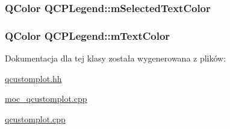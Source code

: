 \subsubsection[{\texorpdfstring{m\+Selected\+Text\+Color}{mSelectedTextColor}}]{\setlength{\rightskip}{0pt plus 5cm}Q\+Color Q\+C\+P\+Legend\+::m\+Selected\+Text\+Color\hspace{0.3cm}{\ttfamily [protected]}}\hypertarget{class_q_c_p_legend_a6c25c8796c6e73e983aae6024965f2be}{}\label{class_q_c_p_legend_a6c25c8796c6e73e983aae6024965f2be}
\subsubsection[{\texorpdfstring{m\+Text\+Color}{mTextColor}}]{\setlength{\rightskip}{0pt plus 5cm}Q\+Color Q\+C\+P\+Legend\+::m\+Text\+Color\hspace{0.3cm}{\ttfamily [protected]}}\hypertarget{class_q_c_p_legend_a478b2d809a7390e9ff8f8bb70d6bd9fe}{}\label{class_q_c_p_legend_a478b2d809a7390e9ff8f8bb70d6bd9fe}


Dokumentacja dla tej klasy została wygenerowana z plików\+:\begin{DoxyCompactItemize}
\item 
\hyperlink{qcustomplot_8hh}{qcustomplot.\+hh}\item 
\hyperlink{moc__qcustomplot_8cpp}{moc\+\_\+qcustomplot.\+cpp}\item 
\hyperlink{qcustomplot_8cpp}{qcustomplot.\+cpp}\end{DoxyCompactItemize}
